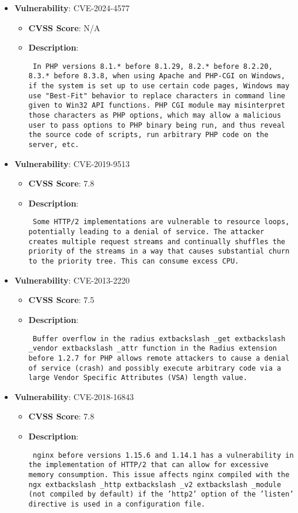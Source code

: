 \documentclass{article}
\begin{document}
\begin{itemize}
        \item \textbf{Vulnerability}: CVE-2024-4577
        \begin{itemize}
            \item \textbf{CVSS Score}:  N/A 
            \item \textbf{Description}: \parbox{\linewidth}{\texttt{ In PHP versions 8.1.* before 8.1.29, 8.2.* before 8.2.20, 8.3.* before 8.3.8, when using Apache and PHP-CGI on Windows, if the system is set up to use certain code pages, Windows may use "Best-Fit" behavior to replace characters in command line given to Win32 API functions. PHP CGI module may misinterpret those characters as PHP options, which may allow a malicious user to pass options to PHP binary being run, and thus reveal the source code of scripts, run arbitrary PHP code on the server, etc. }}
        \end{itemize}
    
        \item \textbf{Vulnerability}: CVE-2019-9513
        \begin{itemize}
            \item \textbf{CVSS Score}:  7.8 
            \item \textbf{Description}: \parbox{\linewidth}{\texttt{ Some HTTP/2 implementations are vulnerable to resource loops, potentially leading to a denial of service. The attacker creates multiple request streams and continually shuffles the priority of the streams in a way that causes substantial churn to the priority tree. This can consume excess CPU. }}
        \end{itemize}
    
        \item \textbf{Vulnerability}: CVE-2013-2220
        \begin{itemize}
            \item \textbf{CVSS Score}:  7.5 
            \item \textbf{Description}: \parbox{\linewidth}{\texttt{ Buffer overflow in the radius	extbackslash _get	extbackslash _vendor	extbackslash _attr function in the Radius extension before 1.2.7 for PHP allows remote attackers to cause a denial of service (crash) and possibly execute arbitrary code via a large Vendor Specific Attributes (VSA) length value. }}
        \end{itemize}
    
        \item \textbf{Vulnerability}: CVE-2018-16843
        \begin{itemize}
            \item \textbf{CVSS Score}:  7.8 
            \item \textbf{Description}: \parbox{\linewidth}{\texttt{ nginx before versions 1.15.6 and 1.14.1 has a vulnerability in the implementation of HTTP/2 that can allow for excessive memory consumption. This issue affects nginx compiled with the ngx	extbackslash _http	extbackslash _v2	extbackslash _module (not compiled by default) if the 'http2' option of the 'listen' directive is used in a configuration file. }}
        \end{itemize}
    

\end{itemize}
\end{document}
